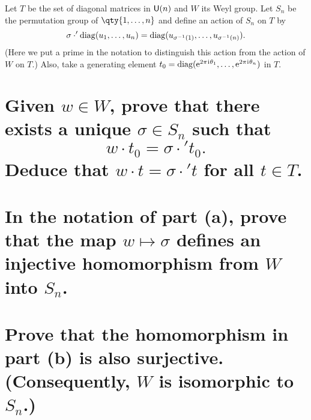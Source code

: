 \documentclass[
	pages,
	boxes,
	color=WildStrawberry
]{homework}
\begin{document}
\begin{problem}
Let $T$ be the set of diagonal matrices in $\mathsf{U}(n)$ and $W$ its Weyl group. Let $S_n$ be the permutation group of $\qty{1, \ldots, n}$ and define an action of $S_n$ on $T$ by
\[
	\sigma \cdot' \operatorname{diag}(u_1, \ldots, u_n) = \operatorname{diag}(u_{\sigma^{-1}(1)}, \ldots, u_{\sigma^{-1}(n)}).
\]
(Here we put a prime in the notation to distinguish this action from the action of $W$ on $T$.) Also, take a generating element $t_0 = \operatorname{diag}(\mathrm{e}^{2\pi\mkern1mu\mathrm{i}\mkern1mu \theta_1}, \ldots, \mathrm{e}^{2\pi\mkern1mu\mathrm{i}\mkern1mu \theta_n})$ in $T$.
\begin{parts}
	\part{Given $w \in W$, prove that there exists a unique $\sigma \in S_n$ such that
		\[
			w \cdot t_0 = \sigma \cdot' t_0.
		\]
		Deduce that $w \cdot t = \sigma \cdot' t$ for all $t \in T$.}\label{part:6a}
	\part{In the notation of part (a), prove that the map $w \mapsto \sigma$ defines an injective homomorphism from $W$ into $S_n$.}\label{part:6b}
	\part{Prove that the homomorphism in part (b) is also surjective. (Consequently, $W$ is isomorphic to $S_n$.)}\label{part:6c}
\end{parts}
\end{problem}
\end{document}
